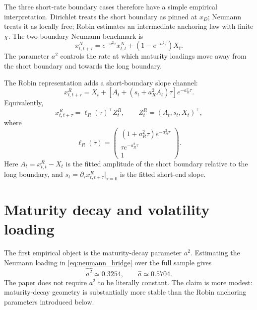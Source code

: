 \documentclass[11pt]{article}
\begin{document}
The three short-rate boundary cases therefore have a simple empirical interpretation. Dirichlet treats the short boundary as pinned at $x_D$; Neumann treats it as locally free; Robin estimates an intermediate anchoring law with finite $\chi$. The two-boundary Neumann benchmark is
\begin{equation}
 x^N_{t,t+\tau}
 =
 e^{-a^2\tau}x^N_{t,t}
 +
 \left(1-e^{-a^2\tau}\right)X_t.
\label{eq:neumann_bridge}
\end{equation}
The parameter $a^2$ controls the rate at which maturity loadings move away from the short boundary and towards the long boundary.

The Robin representation adds a short-boundary slope channel:
\begin{equation}
 x^R_{t,t+\tau}
 =
 X_t+
 \left[A_t+(s_t+a_R^2A_t)\tau\right]e^{-a_R^2\tau}.
\label{eq:robin_bridge}
\end{equation}
Equivalently,
\begin{equation}
 x^R_{t,t+\tau}=\ell_R(\tau)^\top Z_t^R,
 \qquad
 Z_t^R=(A_t,s_t,X_t)^\top,
\end{equation}
where
\begin{equation}
 \ell_R(\tau)=
 \begin{pmatrix}
 (1+a_R^2\tau)e^{-a_R^2\tau}\\
 \tau e^{-a_R^2\tau}\\
 1
 \end{pmatrix}.
\label{eq:robin_loading}
\end{equation}
Here $A_t=x^R_{t,t}-X_t$ is the fitted amplitude of the short boundary relative to the long boundary, and $s_t=\partial_\tau x^R_{t,t+\tau}|_{\tau=0}$ is the fitted short-end slope.

\section{Maturity decay and volatility loading}

The first empirical object is the maturity-decay parameter $a^2$. Estimating the Neumann loading in \eqref{eq:neumann_bridge} over the full sample gives
\begin{equation}
 \widehat{a^2}\simeq 0.3254,
 \qquad
 \hat a\simeq 0.5704.
\end{equation}
The paper does not require $a^2$ to be literally constant. The claim is more modest: maturity-decay geometry is substantially more stable than the Robin anchoring parameters introduced below.
\end{document}
